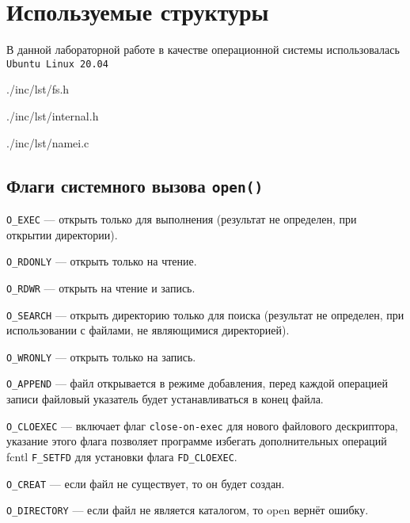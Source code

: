 \chapter{Используемые структуры}

В данной лабораторной работе в качестве операционной системы использовалась \texttt{Ubuntu Linux 20.04}

\begin{lstinputlisting}[label=third,caption=Структура filename, language=c]{./inc/lst/fs.h}
\end{lstinputlisting}

\begin{lstinputlisting}[label=third,caption=open\_flags, language=c]{./inc/lst/internal.h}
\end{lstinputlisting}

\begin{lstinputlisting}[label=third,caption=nameidata, language=c]{./inc/lst/namei.c}
\end{lstinputlisting}

\section*{Флаги системного вызова \texttt{open()}}

\texttt{O\_EXEC} --- открыть только для выполнения (результат не определен, при открытии директории).

\texttt{O\_RDONLY} --- открыть только на чтение.

\texttt{O\_RDWR} --- открыть на чтение и запись.

\texttt{O\_SEARCH} --- открыть директорию только для поиска (результат не определен, при использовании с файлами, не являющимися директорией).

\texttt{O\_WRONLY} --- открыть только на запись.

\texttt{O\_APPEND} --- файл открывается в режиме добавления, перед каждой операцией записи файловый указатель будет устанавливаться в конец файла.

\texttt{O\_CLOEXEC} --- включает флаг \texttt{close-on-exec} для нового файлового дескриптора, указание этого флага позволяет программе избегать дополнительных операций fcntl \texttt{F\_SETFD} для установки флага \texttt{FD\_CLOEXEC}.

\texttt{O\_CREAT} --- если файл не существует, то он будет создан.

\texttt{O\_DIRECTORY} --- если файл не является каталогом, то open вернёт ошибку.

